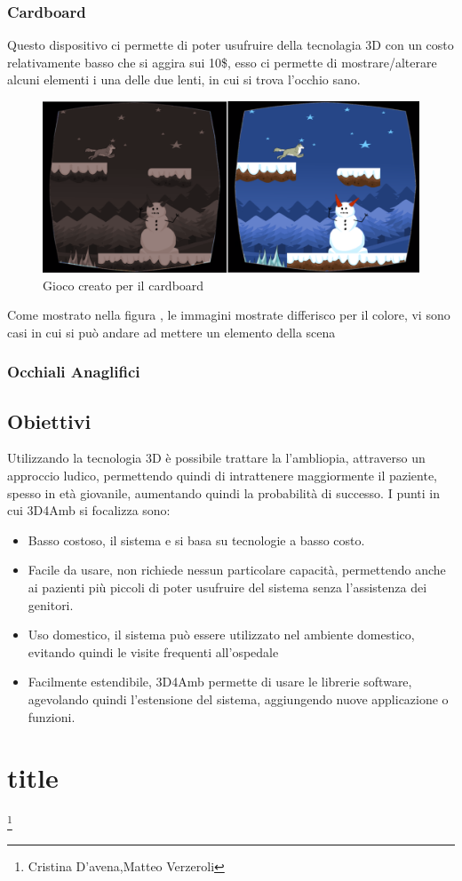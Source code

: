 \documentclass[10pt,a4paper]{article}
\begin{document}
	\subsubsection{Cardboard}
	Questo dispositivo ci permette di poter usufruire della tecnolagia 3D con un costo relativamente basso che si aggira sui 10\$, esso ci permette di mostrare/alterare alcuni elementi i una delle due lenti, in cui si trova l'occhio sano. 
	\begin{figure}[H]
		\centering
		\includegraphics[width=0.7\linewidth]{image/3D4Amb}
		\caption{Gioco creato per il cardboard }
		\label{fig:cardboard-3D4Amb}
	\end{figure}
    Come mostrato nella figura \label{cardboard-3D4Amb}, le immagini mostrate differisco per il colore, vi sono casi in cui si può andare ad mettere un elemento della scena
	\subsubsection{Occhiali Anaglifici}
	\subsection{Obiettivi}
	Utilizzando la tecnologia 3D è possibile trattare la l'ambliopia, attraverso un approccio ludico, permettendo quindi di intrattenere maggiormente il paziente, spesso in età giovanile, aumentando quindi la probabilità di successo.
	I punti in cui 3D4Amb si focalizza sono:
	\begin{itemize}
		\item Basso costoso, il sistema e si basa su tecnologie a basso costo.
		\item Facile da usare, non richiede nessun particolare capacità, permettendo anche ai pazienti più piccoli di poter usufruire del sistema senza l'assistenza dei genitori.
		\item Uso domestico, il sistema può essere utilizzato nel ambiente domestico, evitando quindi le visite frequenti all'ospedale
		\item Facilmente estendibile, 3D4Amb permette di usare le librerie software, agevolando  quindi l'estensione del sistema, aggiungendo nuove applicazione o funzioni.
	\end{itemize}
	
	\section{title}
	\thanks{Cristina D'avena,Matteo Verzeroli }
\end{document}
